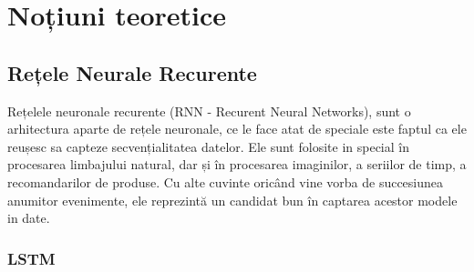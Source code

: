 \chapter{Noțiuni teoretice}

\section{Rețele Neurale Recurente}

Rețelele neuronale recurente (RNN - Recurent Neural Networks), sunt o arhitectura aparte de rețele neuronale, ce le face atat de speciale este faptul ca ele reușesc sa capteze secvențialitatea datelor. Ele sunt folosite in special în procesarea limbajului natural, dar și în procesarea imaginilor, a seriilor de timp, a recomandarilor de produse. Cu alte cuvinte oricând vine vorba de succesiunea anumitor evenimente, ele reprezintă un candidat bun în captarea acestor modele in date.

\subsection{LSTM}
